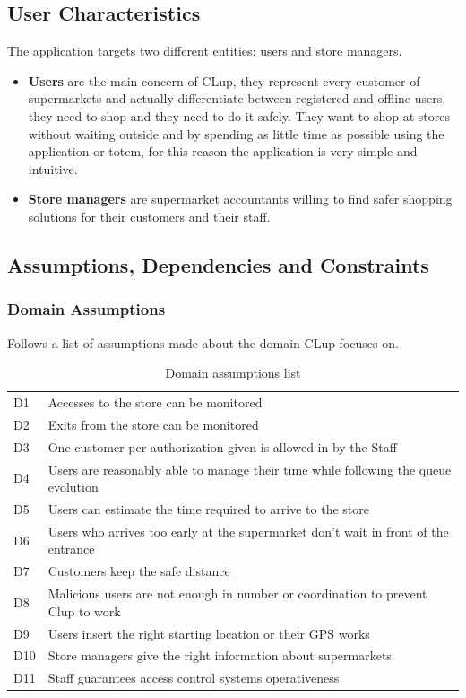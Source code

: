 \subsection{User Characteristics}
The application targets two different entities: users and store managers.
\begin{itemize}
	\item
	\textbf{Users} are the main concern of CLup, they represent every customer of supermarkets and actually differentiate between registered and offline users, they need to shop and they need to do it safely. They want to shop at stores without waiting outside and by spending as little time as possible using the application or totem, for this reason the application is very simple and intuitive.
	\item
	\textbf{Store managers} are supermarket accountants willing to find safer shopping solutions for their customers and their staff.
\end{itemize}



\subsection{Assumptions, Dependencies and Constraints}
\subsubsection{Domain Assumptions}
Follows a list of assumptions made about the domain CLup focuses on.\newline\newline
\begin{table}[H]
\begin{tabular}{l|l}
	D1 & Accesses to the store can be monitored\\
	D2 & Exits from the store can be monitored\\
	D3 & One customer per authorization given is allowed in by the Staff\\
	D4 & Users are reasonably able to manage their time while following the queue evolution\\
    D5 & Users can estimate the time required to arrive to the store\\
    D6 & Users who arrives too early at the supermarket don't wait in front of the entrance\\
    D7 & Customers keep the safe distance\\
    D8 & Malicious users are not enough in number or coordination to prevent Clup to work\\
    D9 & Users insert the right starting location or their GPS works\\
    D10 & Store managers give the right information about supermarkets\\
    D11 & Staff guarantees access control systems operativeness\\
	
\end{tabular}
\caption{Domain assumptions list}
\label{tab:DomAss}
\end{table}
